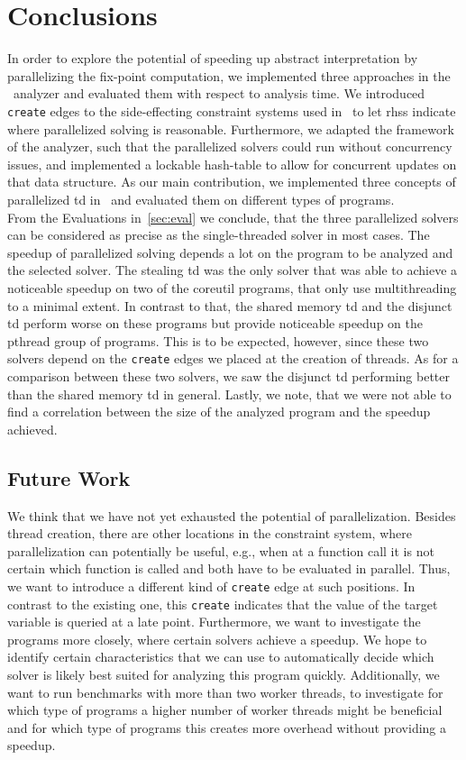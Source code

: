 \section{Conclusions}
\label{sec:conclusions}
In order to explore the potential of speeding up abstract interpretation by parallelizing the fix-point computation, we implemented three approaches in the \gob\ analyzer and evaluated them with respect to analysis time.
We introduced \texttt{create} edges to the side-effecting constraint systems used in \gob\ to let \acp{rhs} indicate where parallelized solving is reasonable. Furthermore, we adapted the framework of the analyzer, such that the parallelized solvers could run without concurrency issues, and implemented a lockable hash-table to allow for concurrent updates on that data structure. As our main contribution, we implemented three concepts of parallelized \acl{td} in \gob\ and evaluated them on different types of programs.\\
From the Evaluations in~\autoref{sec:eval} we conclude, that the three parallelized solvers can be considered as precise as the single-threaded solver in most cases. The speedup of parallelized solving depends a lot on the program to be analyzed and the selected solver. The stealing \ac{td} was the only solver that was able to achieve a noticeable speedup on two of the coreutil programs, that only use multithreading to a minimal extent. In contrast to that, the shared memory \ac{td} and the disjunct \ac{td} perform worse on these programs but provide noticeable speedup on the pthread group of programs. This is to be expected, however, since these two solvers depend on the \texttt{create} edges we placed at the creation of threads. As for a comparison between these two solvers, we saw the disjunct \ac{td} performing better than the shared memory \ac{td} in general. Lastly, we note, that we were not able to find a correlation between the size of the analyzed program and the speedup achieved.

  \label{sec:conclusions:futureWork} 
  \subsection{Future Work}
  We think that we have not yet exhausted the potential of parallelization. Besides thread creation, there are other locations in the constraint system, where parallelization can potentially be useful, e.g., when at a function call it is not certain which function is called and both have to be evaluated in parallel. Thus, we want to introduce a different kind of \texttt{create} edge at such positions. In contrast to the existing one, this \texttt{create} indicates that the value of the target variable is queried at a late point.
  Furthermore, we want to investigate the programs more closely, where certain solvers achieve a speedup. We hope to identify certain characteristics that we can use to automatically decide which solver is likely best suited for analyzing this program quickly. Additionally, we want to run benchmarks with more than two worker threads, to investigate for which type of programs a higher number of worker threads might be beneficial and for which type of programs this creates more overhead without providing a speedup.